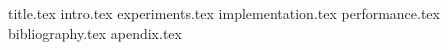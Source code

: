 \documentclass[12pt]{article}
\newcommand*{\sectiondir}{sections/}
\begin{document}
	{title.tex}
	\tableofcontents
	\newpage
	{intro.tex}
	{experiments.tex}
	{implementation.tex}
	{performance.tex}
	{bibliography.tex}
	\newpage
	{apendix.tex}
\end{document}
